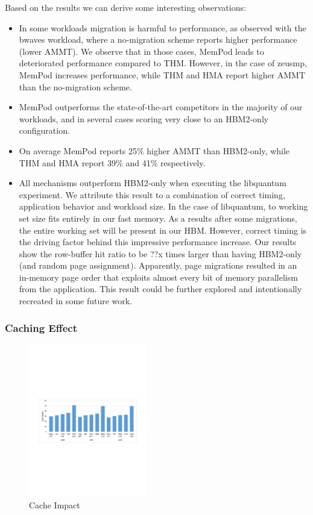 Based on the results we can derive some interesting observations:
\begin{itemize}
	\item In some workloads migration is harmful to performance, as observed with the bwaves workload, where a no-migration scheme reports higher performance (lower AMMT). We observe that in those cases, MemPod leads to deteriorated performance compared to THM. However, in the case of zeusmp, MemPod increases performance, while THM and HMA report higher AMMT than the no-migration scheme.
	\item MemPod outperforms the state-of-the-art competitors in the majority of our workloads, and in several cases scoring very close to an HBM2-only configuration. 
	\item On average MemPod reports 25\% higher AMMT than HBM2-only, while THM and HMA report 39\% and 41\% respectively.
	\item All mechanisms outperform HBM2-only when executing the libquantum experiment. We attribute this result to a combination of correct timing, application behavior and workload size. In the case of libquantum, to working set size fits entirely in our fast memory. As a results after some migrations, the entire working set will be present in our HBM. However, correct timing is the driving factor behind this impressive performance increase. Our results show the row-buffer hit ratio to be ??x times larger than having HBM2-only (and random page assignment). Apparently, page migrations resulted in an in-memory page order that exploits almost every bit of memory parallelism from the application. This result could be further explored and intentionally recreated in some future work.
\end{itemize}

\subsubsection{Caching Effect}

\begin{figure}
  \includegraphics[width=0.46\textwidth]{figures/cache_impact.pdf}
  \caption{\small{Cache Impact}}
  \label{fig:cache}
\end{figure}

